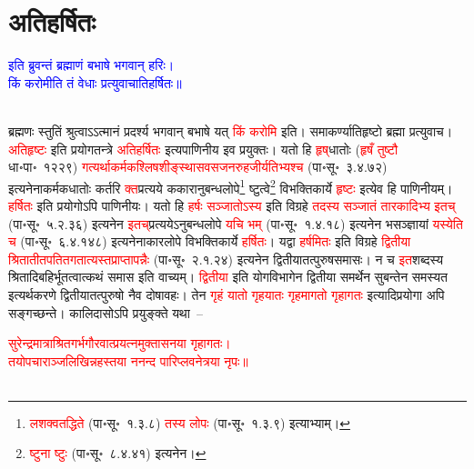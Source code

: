 \section[अतिहर्षितः]{अतिहर्षितः}
\centering\textcolor{blue}{इति ब्रुवन्तं ब्रह्माणं बभाषे भगवान् हरिः।\nopagebreak\\
किं करोमीति तं वेधाः प्रत्युवाचातिहर्षितः॥}\nopagebreak\\
\\
\begin{sloppypar}\justifying\noindent\hspace{10mm} ब्रह्मणः स्तुतिं श्रुत्वाऽऽत्मानं प्रदर्श्य भगवान् बभाषे यत् \textcolor{red}{किं करोमि} इति। समाकर्ण्याति\-हृष्टो ब्रह्मा प्रत्युवाच। \textcolor{red}{अतिहृष्टः} इति प्रयोगतन्त्रे \textcolor{red}{अतिहर्षितः} इत्यपाणिनीय इव प्रयुक्तः। यतो हि \textcolor{red}{हृष्‌}\-धातोः (\textcolor{red}{हृषँ तुष्टौ} धा॰पा॰~१२२९) \textcolor{red}{गत्यर्थाकर्मक\-श्लिष\-शीङ्स्थास\-वस\-जन\-रुह\-जीर्यतिभ्यश्च} (पा॰सू॰~३.४.७२) इत्यनेनाकर्मक\-धातोः कर्तरि \textcolor{red}{क्त}\-प्रत्यये ककारानुबन्ध\-लोपे\footnote{\textcolor{red}{लशक्वतद्धिते} (पा॰सू॰~१.३.८) \textcolor{red}{तस्य लोपः} (पा॰सू॰~१.३.९) इत्याभ्याम्।} ष्टुत्वे\footnote{\textcolor{red}{ष्टुना ष्टुः} (पा॰सू॰~८.४.४१) इत्यनेन।} विभक्तिकार्ये \textcolor{red}{हृष्टः} इत्येव हि पाणिनीयम्। \textcolor{red}{हर्षितः} इति प्रयोगोऽपि पाणिनीयः। यतो हि \textcolor{red}{हर्षः सञ्जातोऽस्य} इति विग्रहे \textcolor{red}{तदस्य सञ्जातं तारकादिभ्य इतच्} (पा॰सू॰~५.२.३६) इत्यनेन \textcolor{red}{इतच्‌}\-प्रत्ययेऽनुबन्ध\-लोपे \textcolor{red}{यचि भम्} (पा॰सू॰~१.४.१८) इत्यनेन भसञ्ज्ञायां \textcolor{red}{यस्येति च} (पा॰सू॰~६.४.१४८) इत्यनेनाकार\-लोपे विभक्ति\-कार्ये \textcolor{red}{हर्षितः}। यद्वा \textcolor{red}{हर्षमितः} इति विग्रहे \textcolor{red}{द्वितीया श्रितातीत\-पतित\-गतात्यस्त\-प्राप्तापन्नैः} (पा॰सू॰~२.१.२४) इत्यनेन द्वितीया\-तत्पुरुष\-समासः। न च \textcolor{red}{इत}\-शब्दस्य श्रितादि\-बहिर्भूतत्वात्कथं समास इति वाच्यम्। \textcolor{red}{द्वितीया} इति योग\-विभागेन द्वितीया समर्थेन सुबन्तेन समस्यत इत्यर्थकरणे द्वितीया\-तत्पुरुषो नैव दोषावहः। तेन \textcolor{red}{गृहं यातो गृहयातः गृहमागतो गृहागतः} इत्यादि\-प्रयोगा अपि सङ्गच्छन्ते। कालिदासोऽपि प्रयुङ्क्ते यथा~–\end{sloppypar}
\centering\textcolor{red}{सुरेन्द्रमात्राश्रितगर्भगौरवात्प्रयत्नमुक्तासनया गृहागतः।\nopagebreak\\
तयोपचाराञ्जलिखिन्नहस्तया ननन्द पारिप्लवनेत्रया नृपः॥}\nopagebreak\\
\\
